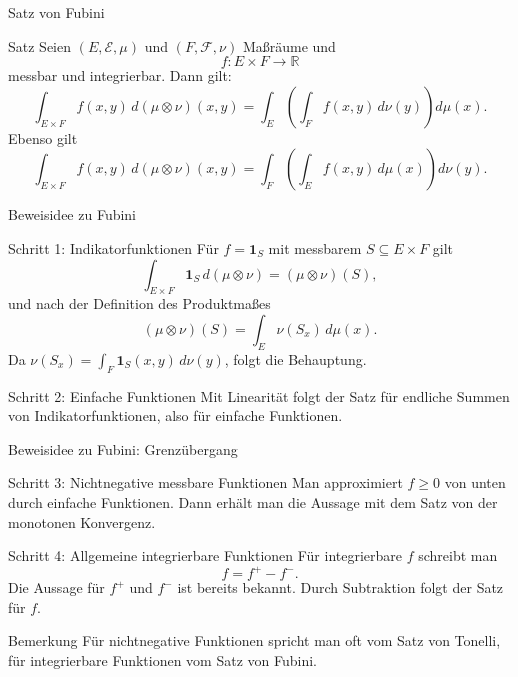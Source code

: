 \documentclass{beamer}
\begin{document}
\begin{frame}{Satz von Fubini}
\begin{block}{Satz}
Seien \((E,\mathcal E,\mu)\) und \((F,\mathcal F,\nu)\) Maßräume und
\[
f\colon E\times F\to\mathbb R
\]
messbar und integrierbar. Dann gilt:
\[
\int_{E\times F} f(x,y)\,d(\mu\otimes\nu)(x,y)
=
\int_E\left(\int_F f(x,y)\,d\nu(y)\right)d\mu(x).
\]
Ebenso gilt
\[
\int_{E\times F} f(x,y)\,d(\mu\otimes\nu)(x,y)
=
\int_F\left(\int_E f(x,y)\,d\mu(x)\right)d\nu(y).
\]
\end{block}
\end{frame}

\begin{frame}{Beweisidee zu Fubini}
\begin{block}{Schritt 1: Indikatorfunktionen}
Für \(f=\mathbf 1_S\) mit messbarem \(S\subseteq E\times F\) gilt
\[
\int_{E\times F}\mathbf 1_S\,d(\mu\otimes\nu)
=
(\mu\otimes\nu)(S),
\]
und nach der Definition des Produktmaßes
\[
(\mu\otimes\nu)(S)=\int_E \nu(S_x)\,d\mu(x).
\]
Da \(\nu(S_x)=\int_F \mathbf 1_S(x,y)\,d\nu(y)\), folgt die Behauptung.
\end{block}

\begin{block}{Schritt 2: Einfache Funktionen}
Mit Linearität folgt der Satz für endliche Summen von Indikatorfunktionen, also für einfache Funktionen.
\end{block}
\end{frame}

\begin{frame}{Beweisidee zu Fubini: Grenzübergang}
\begin{block}{Schritt 3: Nichtnegative messbare Funktionen}
Man approximiert \(f\ge 0\) von unten durch einfache Funktionen.
Dann erhält man die Aussage mit dem Satz von der monotonen Konvergenz.
\end{block}

\begin{block}{Schritt 4: Allgemeine integrierbare Funktionen}
Für integrierbare \(f\) schreibt man
\[
f=f^+-f^-.
\]
Die Aussage für \(f^+\) und \(f^-\) ist bereits bekannt.
Durch Subtraktion folgt der Satz für \(f\).
\end{block}

\begin{block}{Bemerkung}
Für nichtnegative Funktionen spricht man oft vom Satz von Tonelli, für integrierbare Funktionen vom Satz von Fubini.
\end{block}
\end{frame}
\end{document}
